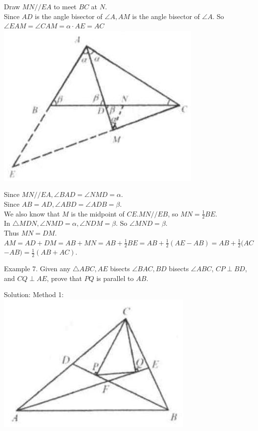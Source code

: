 \documentclass[10pt]{article}
\begin{document}
Draw \(M N / / E A\) to meet \(B C\) at \(N\).\\
Since \(A D\) is the angle bisector of \(\angle A, A M\) is the angle bisector of \(\angle A\). So \(\angle E A M=\angle C A M=\alpha \cdot A E=A C\)\\
\includegraphics[max width=\textwidth, center]{2025_04_17_97bc1f7e44d93c271a88g-058}

Since \(M N / / E A, \angle B A D=\angle N M D=\alpha\).\\
Since \(A B=A D, \angle A B D=\angle A D B=\beta\).\\
We also know that \(M\) is the midpoint of \(C E . M N / / E B\), so \(M N=\frac{1}{2} B E\).\\
In \(\triangle M D N, \angle N M D=\alpha, \angle N D M=\beta\). So \(\angle M N D=\beta\).\\
Thus \(M N=D M\).\\
\(A M=A D+D M=A B+M N=A B+\frac{1}{2} B E=A B+\frac{1}{2}(A E-A B)=A B+\frac{1}{2}(A C\) \(-A B)=\frac{1}{2}(A B+A C)\).

Example 7. Given any \(\triangle A B C, A E\) bisects \(\angle B A C, B D\) bisects \(\angle A B C\), \(C P \perp B D\), and \(C Q \perp A E\), prove that \(P Q\) is parallel to \(A B\).

Solution:
Method 1:\\
\includegraphics[max width=\textwidth, center]{2025_04_17_97bc1f7e44d93c271a88g-058(2)}
\end{document}
